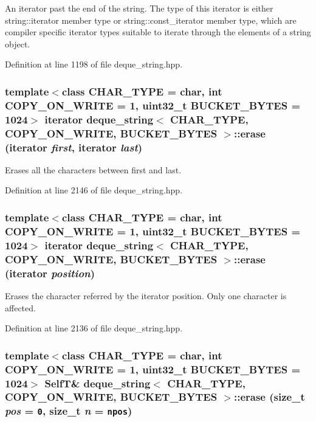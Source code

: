 An iterator past the end of the string. The type of this iterator is either string::iterator member type or string::const\_\-iterator member type, which are compiler specific iterator types suitable to iterate through the elements of a string object. 

Definition at line 1198 of file deque\_\-string.hpp.\hypertarget{classdeque__string_9433d1f64823bcc7f8bced8ab357bf51}{
\subsubsection[{erase}]{\setlength{\rightskip}{0pt plus 5cm}template$<$class CHAR\_\-TYPE  = char, int COPY\_\-ON\_\-WRITE = 1, uint32\_\-t BUCKET\_\-BYTES = 1024$>$ iterator {\bf deque\_\-string}$<$ CHAR\_\-TYPE, COPY\_\-ON\_\-WRITE, BUCKET\_\-BYTES $>$::erase (iterator {\em first}, \/  iterator {\em last})}}
\label{classdeque__string_9433d1f64823bcc7f8bced8ab357bf51}


Erases all the characters between first and last. 

Definition at line 2146 of file deque\_\-string.hpp.\hypertarget{classdeque__string_64f3c87f7723580db6d3faa52d61cdbc}{
\subsubsection[{erase}]{\setlength{\rightskip}{0pt plus 5cm}template$<$class CHAR\_\-TYPE  = char, int COPY\_\-ON\_\-WRITE = 1, uint32\_\-t BUCKET\_\-BYTES = 1024$>$ iterator {\bf deque\_\-string}$<$ CHAR\_\-TYPE, COPY\_\-ON\_\-WRITE, BUCKET\_\-BYTES $>$::erase (iterator {\em position})}}
\label{classdeque__string_64f3c87f7723580db6d3faa52d61cdbc}


Erases the character referred by the iterator position. Only one character is affected. 

Definition at line 2136 of file deque\_\-string.hpp.\hypertarget{classdeque__string_2c63c675c2fad7c5c3dd2e602e910d95}{
\subsubsection[{erase}]{\setlength{\rightskip}{0pt plus 5cm}template$<$class CHAR\_\-TYPE  = char, int COPY\_\-ON\_\-WRITE = 1, uint32\_\-t BUCKET\_\-BYTES = 1024$>$ {\bf SelfT}\& {\bf deque\_\-string}$<$ CHAR\_\-TYPE, COPY\_\-ON\_\-WRITE, BUCKET\_\-BYTES $>$::erase (size\_\-t {\em pos} = {\tt 0}, \/  size\_\-t {\em n} = {\tt {\bf npos}})}}
\label{classdeque__string_2c63c675c2fad7c5c3dd2e602e910d95}


